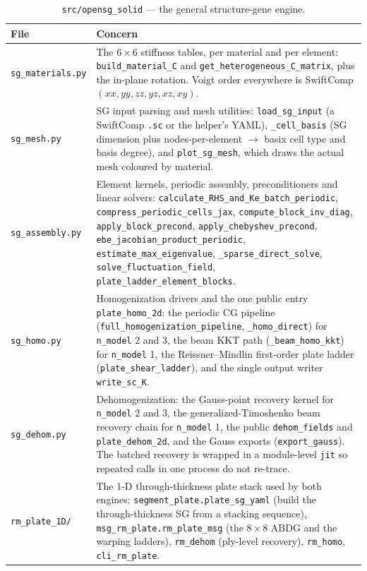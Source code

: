 \begin{table}[htbp]
\centering
\caption{\texttt{src/opensg\_solid} --- the general structure-gene engine.}
\label{tab:mod-solid}
\small
\begin{tabular}{@{}lp{9.1cm}@{}}
\toprule
File & Concern \\
\midrule
\texttt{sg\_materials.py} &
The $6\times6$ stiffness tables, per material and per element:
\texttt{build\_material\_C} and \texttt{get\_heterogeneous\_C\_matrix}, plus the
in-plane rotation. Voigt order everywhere is SwiftComp
$(xx, yy, zz, yz, xz, xy)$. \\
\texttt{sg\_mesh.py} &
SG input parsing and mesh utilities: \texttt{load\_sg\_input} (a SwiftComp
\texttt{.sc} or the helper's YAML), \texttt{\_cell\_basis} (SG dimension plus
nodes-per-element $\rightarrow$ basix cell type and basis degree), and
\texttt{plot\_sg\_mesh}, which draws the actual mesh coloured by material. \\
\texttt{sg\_assembly.py} &
Element kernels, periodic assembly, preconditioners and linear solvers:
\texttt{calculate\_RHS\_and\_Ke\_batch\_periodic},
\texttt{compress\_periodic\_cells\_jax}, \texttt{compute\_block\_inv\_diag},
\texttt{apply\_block\_precond}, \texttt{apply\_chebyshev\_precond},
\texttt{ebe\_jacobian\_product\_periodic},
\texttt{estimate\_max\_eigenvalue}, \texttt{\_sparse\_direct\_solve},
\texttt{solve\_fluctuation\_field},
\texttt{plate\_ladder\_element\_blocks}. \\
\texttt{sg\_homo.py} &
Homogenization drivers and the one public entry \texttt{plate\_homo\_2d}: the
periodic CG pipeline (\texttt{full\_homogenization\_pipeline},
\texttt{\_homo\_direct}) for \texttt{n\_model} 2 and 3, the beam KKT path
(\texttt{\_beam\_homo\_kkt}) for \texttt{n\_model} 1, the Reissner--Mindlin
first-order plate ladder (\texttt{plate\_shear\_ladder}), and the single output
writer \texttt{write\_sc\_K}. \\
\texttt{sg\_dehom.py} &
Dehomogenization: the Gauss-point recovery kernel for \texttt{n\_model} 2 and 3,
the generalized-Timoshenko beam recovery chain for \texttt{n\_model} 1, the
public \texttt{dehom\_fields} and \texttt{plate\_dehom\_2d}, and the Gauss
exports (\texttt{export\_gauss}). The batched recovery is wrapped in a
module-level \texttt{jit} so repeated calls in one process do not re-trace. \\
\texttt{rm\_plate\_1D/} &
The 1-D through-thickness plate stack used by both engines:
\texttt{segment\_plate.plate\_sg\_yaml} (build the through-thickness SG from a
stacking sequence), \texttt{msg\_rm\_plate.rm\_plate\_msg} (the $8\times8$ ABDG
and the warping ladders), \texttt{rm\_dehom} (ply-level recovery),
\texttt{rm\_homo}, \texttt{cli\_rm\_plate}. \\
\bottomrule
\end{tabular}
\end{table}

